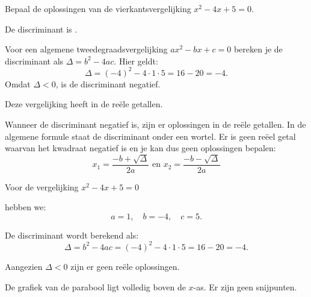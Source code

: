\documentclass{ximera}
\begin{document}
\begin{exercise}

    Bepaal de oplossingen van de vierkantsvergelijking \( x^2 - 4x + 5 = 0 \). 
    
    
    \begin{question}
    De discriminant is \choicenegatief.
    \begin{feedback}
        Voor een algemene tweedegraadsvergelijking \(ax^2 - bx + c = 0\) bereken je de discriminant als \(\Delta = b^2 - 4ac\). 
        Hier geldt: 
        \[
        \Delta = (-4)^2 - 4\cdot1\cdot5 = 16 - 20 = -4.
        \]
        Omdat \(\Delta < 0\), is de discriminant negatief.
    \end{feedback}
    \end{question}
    
    \begin{question}
    Deze vergelijking heeft \choicegeen  in de reële getallen.
    \begin{feedback}
        Wanneer de discriminant negatief is, zijn er oplossingen in de reële getallen. 
        In de algemene formule staat de discriminant onder een wortel. 
        Er is geen reëel getal waarvan het kwadraat negatief is en je kan dus geen oplossingen bepalen: 
        \[
        x_{1} = \frac{-b + \sqrt{\Delta}}{2a}  \text{ en }  x_{2} = \frac{-b - \sqrt{\Delta}}{2a}
        \]

    \end{feedback}
    \end{question}
    
    \begin{oplossing}
    Voor de vergelijking \( x^2 - 4x + 5 = 0 \)
    
    hebben we:
    \[
    a = 1,\quad b = -4,\quad c = 5.
    \]
    
    De discriminant wordt berekend als:
    \[
    \Delta = b^2 - 4ac = (-4)^2 - 4\cdot1\cdot5 = 16 - 20 = -4.
    \]
    
    Aangezien \(\Delta < 0\) zijn er geen reële oplossingen. 

    De grafiek van de parabool ligt volledig boven de \(x\)-as. Er zijn geen snijpunten. 
    \begin{image}
    \end{image}

    
    \end{oplossing}
    
\end{exercise}
    
\end{document}
